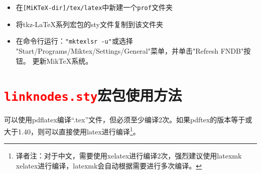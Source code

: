 \documentclass[DIV=14,
               fontsize=10,
               headinclude=false,
               index=totoc,
               footinclude=false,
               headings=small]{tkz-doc-zh}
\begin{document}
\begin{enumerate}
            \begin{itemize}
				\item 在\texttt{[MiKTeX-dir]/tex/latex}中新建一个\texttt{prof}文件夹
				\item 将tkz-\LaTeX{}系列宏包的sty文件复制到该文件夹
              \item 在命令行运行：\newline\texttt{"mktexlsr
                  -u"}\newline 或选择\newline
                  "Start/Programs/Miktex/Settings/General"菜单，并单击"Refresh FNDB"按钮。\newline
				  更新MikTeX系统。
            \end{itemize}
      \end{enumerate}

\vfill\newpage
\section{\texttt{\textcolor{red}{linknodes.sty}}宏包使用方法}

\bigskip
可以使用pdflatex编译\enquote{.tex}文件，但必须至少编译2次。如果pdftex的版本等于或大于1.40，则可以直接使用latex进行编译\footnote{译者注：对于中文，需要使用xelatex进行编译2次，强烈建议使用latexmk xelatex进行编译，latexmk会自动根据需要进行多次编译。}。
\end{document}
